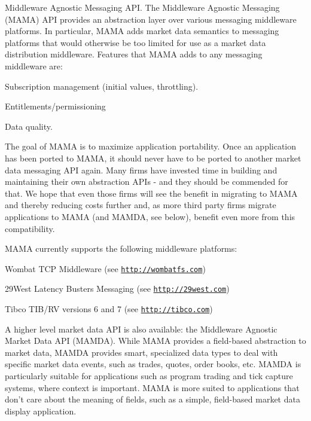 Middleware Agnostic Messaging API. The Middleware Agnostic Messaging (MAMA) API provides an abstraction layer over various messaging middleware platforms. In particular, MAMA adds market data semantics to messaging platforms that would otherwise be too limited for use as a market data distribution middleware. Features that MAMA adds to any messaging middleware are:
\begin{DoxyItemize}
\item Subscription management (initial values, throttling).
\item Entitlements/permissioning
\item Data quality.
\end{DoxyItemize}

The goal of MAMA is to maximize application portability. Once an application has been ported to MAMA, it should never have to be ported to another market data messaging API again. Many firms have invested time in building and maintaining their own abstraction APIs -\/ and they should be commended for that. We hope that even those firms will see the benefit in migrating to MAMA and thereby reducing costs further and, as more third party firms migrate applications to MAMA (and MAMDA, see below), benefit even more from this compatibility.

MAMA currently supports the following middleware platforms:
\begin{DoxyItemize}
\item Wombat TCP Middleware (see \href{http://wombatfs.com}{\tt http://wombatfs.com})
\item 29West Latency Busters Messaging (see \href{http://29west.com}{\tt http://29west.com})
\item Tibco TIB/RV versions 6 and 7 (see \href{http://tibco.com}{\tt http://tibco.com})
\end{DoxyItemize}

A higher level market data API is also available: the Middleware Agnostic Market Data API (MAMDA). While MAMA provides a field-\/based abstraction to market data, MAMDA provides smart, specialized data types to deal with specific market data events, such as trades, quotes, order books, etc. MAMDA is particularly suitable for applications such as program trading and tick capture systems, where context is important. MAMA is more suited to applications that don't care about the meaning of fields, such as a simple, field-\/based market data display application. 